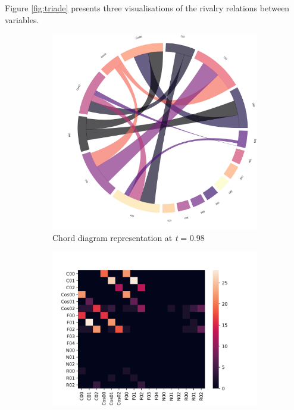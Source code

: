 Figure \ref{fig:triade} presents three visualisations of the rivalry relations between variables.
\begin{figure}[!hb]
	\centering
	\begin{subfigure}[b]{0.3\linewidth}
		\includegraphics[width=\linewidth]{figures/chords/chord_swap_Ensemble1000_RCN5333300_097.png}
		\caption{Chord diagram representation at \emph{t} = 0.98}
	\end{subfigure}
	\hfill
	\begin{subfigure}[b]{0.3\linewidth}
		\includegraphics[width=\linewidth]{figures/heatmaps/heatmap_swap_Ensemble1000_RCN5333300_097.png}

\end{subfigure}
\end{figure}
